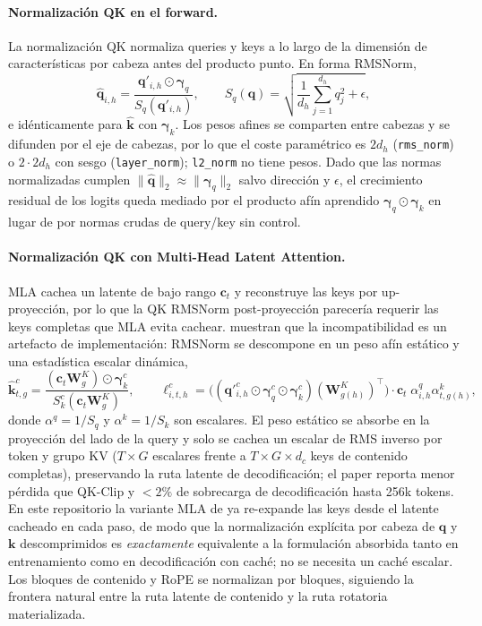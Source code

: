\paragraph{Normalización QK en el forward.}
La normalización QK \citep{henry2020querykey} normaliza queries y keys a lo largo de la dimensión de características por cabeza antes del producto punto. En forma RMSNorm,
\[
\hat{\mathbf{q}}_{i,h} = \frac{\mathbf{q}'_{i,h}\odot\boldsymbol{\gamma}_q}{S_q(\mathbf{q}'_{i,h})},\qquad
S_q(\mathbf{q}) = \sqrt{\frac{1}{d_h}\sum_{j=1}^{d_h} q_j^2 + \epsilon},
\]
e idénticamente para $\hat{\mathbf{k}}$ con $\boldsymbol{\gamma}_k$. Los pesos afines se comparten entre cabezas y se difunden por el eje de cabezas, por lo que el coste paramétrico es $2d_h$ (\texttt{rms\_norm}) o $2\cdot 2d_h$ con sesgo (\texttt{layer\_norm}); \texttt{l2\_norm} no tiene pesos. Dado que las normas normalizadas cumplen $\|\hat{\mathbf{q}}\|_2 \approx \|\boldsymbol{\gamma}_q\|_2$ salvo dirección y $\epsilon$, el crecimiento residual de los logits queda mediado por el producto afín aprendido $\boldsymbol{\gamma}_q\odot\boldsymbol{\gamma}_k$ en lugar de por normas crudas de query/key sin control.

\paragraph{Normalización QK con Multi-Head Latent Attention.}
MLA cachea un latente de bajo rango $\mathbf{c}_t$ y reconstruye las keys por up-proyección, por lo que la QK RMSNorm post-proyección parecería requerir las keys completas que MLA evita cachear. \citet{han2026qknormed} muestran que la incompatibilidad es un artefacto de implementación: RMSNorm se descompone en un peso afín estático y una estadística escalar dinámica,
\[
\hat{\mathbf{k}}^c_{t,g}=\frac{(\mathbf{c}_t\mathbf{W}^K_g)\odot\boldsymbol{\gamma}^c_k}{S^c_k(\mathbf{c}_t\mathbf{W}^K_g)},\qquad
\ell^c_{i,t,h}=\big((\mathbf{q}'^{c}_{i,h}\odot\boldsymbol{\gamma}^c_q\odot\boldsymbol{\gamma}^c_k)(\mathbf{W}^K_{g(h)})^\top\big)\cdot\mathbf{c}_t\;\alpha^q_{i,h}\alpha^k_{t,g(h)},
\]
donde $\alpha^q=1/S_q$ y $\alpha^k=1/S_k$ son escalares. El peso estático se absorbe en la proyección del lado de la query y solo se cachea un escalar de RMS inverso por token y grupo KV ($T\times G$ escalares frente a $T\times G\times d_c$ keys de contenido completas), preservando la ruta latente de decodificación; el paper reporta menor pérdida que QK-Clip y $<2\%$ de sobrecarga de decodificación hasta 256k tokens. En este repositorio la variante MLA de \citet{mehta_mla_2025} ya re-expande las keys desde el latente cacheado en cada paso, de modo que la normalización explícita por cabeza de $\mathbf{q}$ y $\mathbf{k}$ descomprimidos es \emph{exactamente} equivalente a la formulación absorbida tanto en entrenamiento como en decodificación con caché; no se necesita un caché escalar. Los bloques de contenido y RoPE se normalizan por bloques, siguiendo la frontera natural entre la ruta latente de contenido y la ruta rotatoria materializada.

